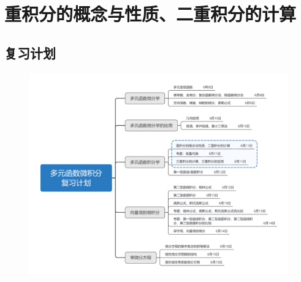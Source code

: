 \documentclass[12pt,UTF8]{ctexart}
\begin{document}
\setcounter{section}{5}
\section{重积分的概念与性质、二重积分的计算}
\noindent
\subsection{复习计划}
\begin{figure}[H]
\begin{center}
\includegraphics[height=0.5\textheight]{Figures20190611/plan.png}
\end{center}
\end{figure}
\end{document}
